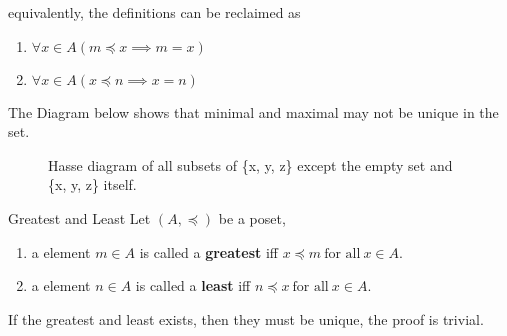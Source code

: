 \begin{remarks}
    equivalently, the definitions can be reclaimed as 
    \begin{enumerate}

        \item $\forall x \in A (m \preceq x \implies m = x)$
        \item $\forall x \in A (x \preceq n \implies x = n)$

    \end{enumerate}
\end{remarks}

\begin{examples}
    The Diagram below shows that minimal and maximal may not be unique in the set.
\end{examples}

\begin{figure}[ht]
    \centering
    \caption{Hasse diagram of all subsets of \{x, y, z\} except the empty set and \{x, y, z\} itself.}
\end{figure}

\begin{definition}{Greatest and Least}{}
    Let $(A,\preceq)$ be a poset, 
    \begin{enumerate}

            \item a element $m \in A$ is called a \textbf{greatest} iff $x \preceq m \ \text{for all}\ x \in A$.
            \item a element $n \in A$ is called a \textbf{least} iff $n \preceq x \ \text{for all}\ x \in A$.

    \end{enumerate}

\end{definition}

\begin{remarks}
    If the greatest and least exists, then they must be unique, the proof is trivial.
\end{remarks}

